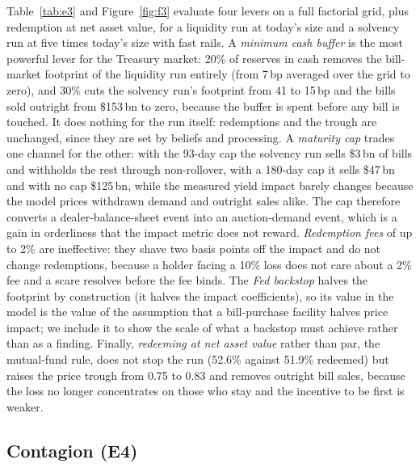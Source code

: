 Table~\ref{tab:e3} and Figure~\ref{fig:f3} evaluate four levers on a full factorial grid, plus redemption at net
asset value, for a liquidity run at today's size and a solvency run at five times today's size with fast rails.
A \emph{minimum cash buffer} is the most powerful lever for the Treasury market: 20\% of reserves in cash removes
the bill-market footprint of the liquidity run entirely (from 7\,bp averaged over the grid to zero), and 30\% cuts
the solvency run's footprint from 41 to 15\,bp and the bills sold outright from \$153\,bn to zero, because the
buffer is spent before any bill is touched. It does nothing for the run itself: redemptions and the trough are
unchanged, since they are set by beliefs and processing. A \emph{maturity cap} trades one channel for the other:
with the 93-day cap the solvency run sells \$3\,bn of bills and withholds the rest through non-rollover, with a
180-day cap it sells \$47\,bn and with no cap \$125\,bn, while the measured yield impact barely changes because the
model prices withdrawn demand and outright sales alike. The cap therefore converts a dealer-balance-sheet event
into an auction-demand event, which is a gain in orderliness that the impact metric does not reward.
\emph{Redemption fees} of up to 2\% are ineffective: they shave two basis points off the impact and do not change
redemptions, because a holder facing a 10\% loss does not care about a 2\% fee and a scare resolves before the fee
binds. The \emph{Fed backstop} halves the footprint by construction (it halves the impact coefficients), so its
value in the model is the value of the assumption that a bill-purchase facility halves price impact; we include it
to show the scale of what a backstop must achieve rather than as a finding. Finally, \emph{redeeming at net asset
value} rather than par, the mutual-fund rule, does not stop the run (52.6\% against 51.9\% redeemed) but raises the
price trough from 0.75 to 0.83 and removes outright bill sales, because the loss no longer concentrates on those
who stay and the incentive to be first is weaker.

\subsection{Contagion (E4)}\label{sec:e4}

\begin{table}[tbp]\centering\small
\caption{E4 contagion: a shock to Issuer~A spills over to Issuer~B's beliefs with weight $\beta$ on A's depeg
(300 paths). The Issuer~B columns are B's outcomes; ``combined impact'' applies the persistent impact function to
both issuers' net demand withdrawn.}
\label{tab:e4}
\end{table}

